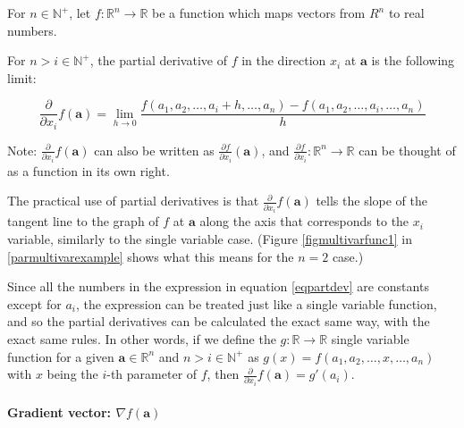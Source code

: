 \documentclass[titlepage]{article}
\begin{document}
          For $n \in \mathbb{N}^+$, let $f : \mathbb{R}^n \rightarrow \mathbb{R}$
          be a function which maps vectors from $R^n$ to real numbers.

          For $n > i \in \mathbb{N}^+$, the partial derivative of $f$ in the
          direction $x_i$ at $\mathbf{a}$ is the following limit:

          \begin{equation} \label{eqpartdev}
            \frac{\partial}{\partial x_i} f(\mathbf{a})
              = \lim_{h \to 0}
                  \frac{
                    f(a_1, a_2, \ldots, a_i + h, \ldots, a_n)
                    - f(a_1, a_2, \ldots, a_i, \ldots, a_n)
                  }{
                    h
                  }
          \end{equation}

          Note: $\frac{\partial}{\partial x_i} f(\mathbf{a})$ can also be
          written as $\frac{\partial f}{\partial x_i} (\mathbf{a})$, and
          $\frac{\partial f}{\partial x_i} : \mathbb{R}^n \rightarrow \mathbb{R}$
          can be thought of as a function in its own right.

          The practical use of partial derivatives is that
          $\frac{\partial}{\partial x_i} f(\mathbf{a})$ tells the slope
          of the tangent line to the graph of $f$ at $\mathbf{a}$ along the
          axis that corresponds to the $x_i$ variable, similarly to the single
          variable case. (Figure \ref{figmultivarfunc1} in
          \ref{parmultivarexample} shows what this means for the $n=2$ case.)

          Since all the numbers in the expression in equation \ref{eqpartdev}
          are constants except for $a_i$, the expression can be treated just
          like a single variable function, and so the partial derivatives can be
          calculated the exact same way, with the exact same rules. In other
          words, if we define the $g : \mathbb{R} \rightarrow \mathbb{R}$
          single variable function for a given $\mathbf{a} \in \mathbb{R}^n$ and
          $n > i \in \mathbb{N}^+$ as
          $g(x) = f(a_1, a_2, \ldots, x, \ldots, a_n)$ with $x$ being the $i$-th
          parameter of $f$, then
          $\frac{\partial}{\partial x_i} f(\mathbf{a}) = g'(a_i)$.

          \paragraph{Gradient vector: $\nabla f(\mathbf{a})$}
\end{document}
